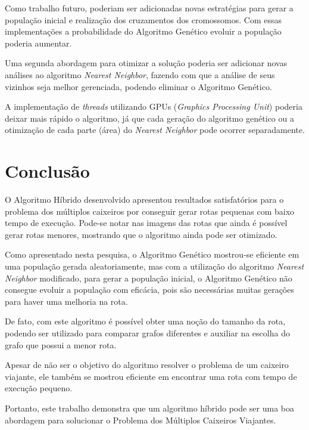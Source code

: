 \documentclass[12pt,openright,a4paper,twoside]{tcc}
\begin{document}
	Como trabalho futuro, poderiam ser adicionadas novas estratégias para gerar a população inicial e realização dos cruzamentos dos cromossomos. Com essas implementações a probabilidade do Algoritmo Genético evoluir a população poderia aumentar.

	Uma segunda abordagem para otimizar a solução poderia ser adicionar novas análises ao algoritmo \textit{Nearest Neighbor}, fazendo com que a análise de seus vizinhos seja melhor gerenciada, podendo eliminar o Algoritmo Genético.

	A implementação de \textit{threads} utilizando GPUs (\textit{Graphics Processing Unit}) poderia deixar mais rápido o algoritmo, já que cada geração do algoritmo genético ou a otimização de cada parte (área) do \textit{Nearest Neighbor} pode ocorrer separadamente. 
	

	\chapter{Conclusão}
		
	O Algoritmo Híbrido desenvolvido apresentou resultados satisfatórios para o problema dos múltiplos caixeiros por conseguir gerar rotas pequenas com baixo tempo de execução. Pode-se notar nas imagens das rotas que ainda é possível gerar rotas menores, mostrando que o algoritmo ainda pode ser otimizado.

    Como apresentado nesta pesquisa, o Algoritmo Genético mostrou-se eficiente em uma população gerada aleatoriamente, mas com a utilização do algoritmo \textit{Nearest Neighbor} modificado, para gerar a população inicial, o Algoritmo Genético não consegue evoluir a população com eficácia, pois são necessárias muitas gerações para haver uma melhoria na rota.

    De fato, com este algoritmo é possível obter uma noção do tamanho da rota, podendo ser utilizado para comparar grafos diferentes e auxiliar na escolha do grafo que possui a menor rota.

    Apesar de não ser o objetivo do algoritmo resolver o problema de um caixeiro viajante, ele também se mostrou eficiente em encontrar uma rota com tempo de execução pequeno.

    Portanto, este trabalho demonstra que um algoritmo híbrido pode ser uma boa abordagem para solucionar o Problema dos Múltiplos Caixeiros Viajantes.  


	\postextual
	
\end{document}
